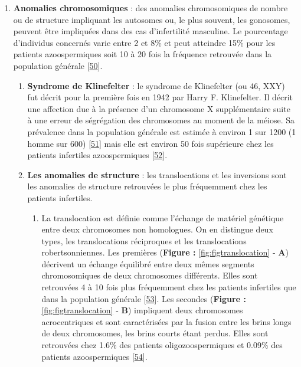 \documentclass[12pt,twoside]{reedthesis}
\providecommand{\tightlist}{%
  \setlength{\itemsep}{0pt}\setlength{\parskip}{0pt}}
\theoremstyle{definition}
\theoremstyle{definition}
\theoremstyle{remark}
\begin{document}
  \begin{enumerate}
  \def\labelenumi{\arabic{enumi}.}
  \setcounter{enumi}{1}
  \tightlist
  \item
    \textbf{Anomalies chromosomiques} : des anomalies chromosomiques de
    nombre ou de structure impliquant les autosomes ou, le plus souvent,
    les gonosomes, peuvent être impliquées dans des cas d'infertilité
    masculine. Le pourcentage d'individus concernés varie entre 2 et 8\%
    et peut atteindre 15\% pour les patients azoospermiques soit 10 à 20
    fois la fréquence retrouvée dans la population générale
    {[}\protect\hyperlink{ref-Ravel2006}{50}{]}.
  
    \begin{enumerate}
    \def\labelenumii{\alph{enumii}.}
    \item
      \textbf{Syndrome de Klinefelter} : le syndrome de Klinefelter (ou
      46, XXY) fut décrit pour la première fois en 1942 par Harry F.
      Klinefelter. Il décrit une affection due à la présence d'un
      chromosome X supplémentaire suite à une erreur de ségrégation des
      chromosomes au moment de la méiose. Sa prévalence dans la population
      générale est estimée à environ 1 sur 1200 (1 homme sur 600)
      {[}\protect\hyperlink{ref-Bojesen2011}{51}{]} mais elle est environ
      50 fois supérieure chez les patients infertiles azoospermiques
      {[}\protect\hyperlink{ref-Gekas2001}{52}{]}.
    \item
      \textbf{Les anomalies de structure} : les translocations et les
      inversions sont les anomalies de structure retrouvées le plus
      fréquemment chez les patients infertiles.
  
      \begin{enumerate}
      \def\labelenumiii{\roman{enumiii}.}
      \tightlist
      \item
        La translocation est définie comme l'échange de matériel génétique
        entre deux chromosomes non homologues. On en distingue deux types,
        les translocations réciproques et les translocations
        robertsonniennes. Les premières (\textbf{Figure :}
        \ref{fig:figtranslocation} - \textbf{A}) décrivent un échange
        équilibré entre deux mêmes segments chromosomiques de deux
        chromosomes différents. Elles sont retrouvées 4 à 10 fois plus
        fréquemment chez les patients infertiles que dans la population
        générale {[}\protect\hyperlink{ref-Elliott1997}{53}{]}. Les
        secondes (\textbf{Figure :} \ref{fig:figtranslocation} -
        \textbf{B}) impliquent deux chromosomes acrocentriques et sont
        caractérisées par la fusion entre les brins longs de deux
        chromosomes, les brins courts étant perdus. Elles sont retrouvées
        chez 1.6\% des patients oligozoospermiques et 0.09\% des patients
        azoospermiques {[}\protect\hyperlink{ref-OFlynnOBrien2010}{54}{]}.
      \end{enumerate}
    \end{enumerate}
  \end{enumerate}
  
\end{document}
